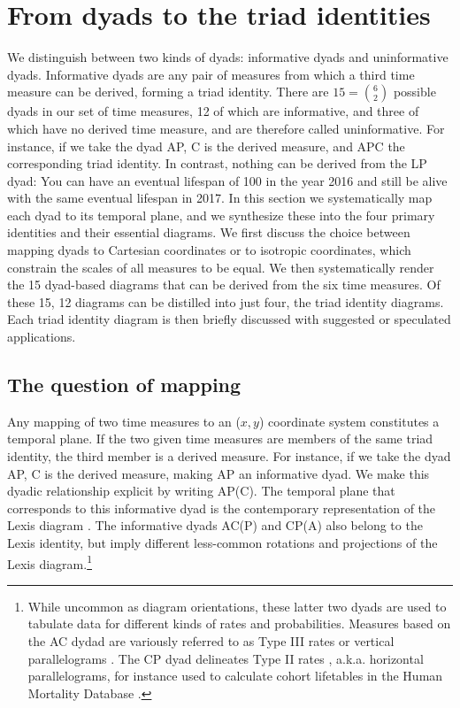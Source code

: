 \documentclass[12pt,oneside,a4paper]{article} %
\begin{document}

\section{From dyads to the triad identities}
We distinguish between two kinds of dyads: informative dyads and uninformative dyads. Informative dyads are any pair of measures from which a third time measure
can be derived, forming a triad identity. There are
$15=\binom{6}{2}$ possible dyads in our set of time measures, 12 of which are informative, and three of which have no derived time measure, and are therefore called uninformative. For instance, if we take the dyad AP,
C is the derived measure, and APC the corresponding triad identity. In contrast,
nothing can be derived from the LP dyad: You can have an eventual lifespan of
100 in the year 2016 and still be alive with the same eventual lifespan in 2017.
In this section we systematically map each dyad to its temporal plane, and we
synthesize these into the four primary identities and their essential diagrams.
We first discuss the choice between mapping dyads to Cartesian coordinates or to
isotropic coordinates, which constrain the scales of all measures to be equal. We then systematically render the 15
dyad-based diagrams that can be derived from the six time measures. Of these 15,
12 diagrams can be distilled into just four, the triad identity diagrams. Each
triad identity diagram is then briefly discussed with suggested or speculated
applications.

\subsection{The question of mapping}
Any mapping of two time measures to an ($x,y$) coordinate
system constitutes a temporal plane. If the two given time measures are members of the same triad identity, the third member is a derived
measure. For instance, if we take the dyad AP, C is the derived
measure, making AP an informative dyad. We make this dyadic relationship
explicit by writing AP(C).
The temporal plane that corresponds to this informative dyad is the contemporary representation of the
Lexis diagram \citep{pressat1961analyse,lexis1875einleitung}. The informative
dyads AC(P) and CP(A) also belong to the Lexis identity, but imply different
less-common rotations and projections of the Lexis diagram.\footnote{While
uncommon as diagram orientations, these latter two dyads are used to tabulate
data for different kinds of rates and probabilities. Measures
based on the AC dydad are variously referred to as Type III rates
\citep{caselli2005demography} or vertical parallelograms \citep{HMDMP}. The CP
dyad delineates Type II rates \citep{caselli2005demography}, a.k.a. horizontal
parallelograms, for instance used to calculate cohort lifetables in the Human
Mortality Database \citep{HMDMP}. }
\end{document}
